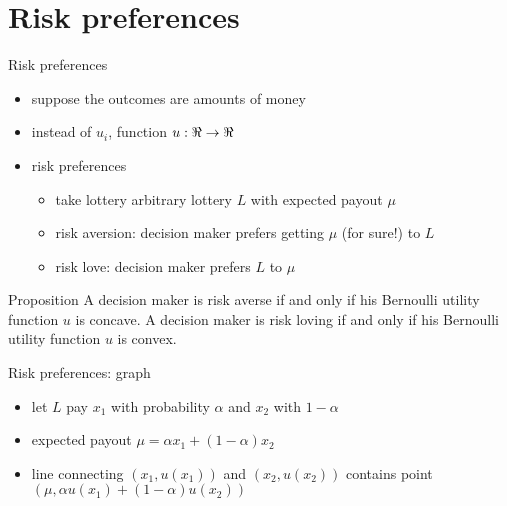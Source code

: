 \documentclass[bigger]{beamer}
\begin{document}
\section{Risk preferences}
\label{sec:org44f3e05}
\begin{frame}[label={sec:org33037f8}]{Risk preferences}
\begin{itemize}
\item suppose the outcomes are amounts of money
\item instead of \(u_i\),  function  \(u:\Re\rightarrow\Re\)
\item risk preferences
\begin{itemize}
\item take lottery arbitrary lottery \(L\) with expected payout \(\mu\)
\item risk aversion: decision maker prefers getting \(\mu\) (for sure!) to \(L\)
\item risk love: decision maker prefers \(L\) to \(\mu\)
\end{itemize}
\end{itemize}

\begin{block}{Proposition}
A decision maker is risk averse if and only if his Bernoulli utility function \(u\) is concave.\linebreak
A decision maker is risk loving if and only if his Bernoulli utility function \(u\) is convex.
\end{block}
\end{frame}

\begin{frame}[label={sec:orga82766d}]{Risk preferences: graph}
\begin{itemize}
\item let \(L\) pay \(x_1\) with probability \(\alpha\) and \(x_2\) with \(1-\alpha\)
\item expected payout \(\mu=\alpha x_1+(1-\alpha)x_2\)
\item line connecting \((x_1,u(x_1))\) and \((x_2,u(x_2))\) contains point \((\mu,\alpha u(x_1)+(1-\alpha)u(x_2))\)
\end{itemize}
\begin{figure}   
\end{figure}
\end{frame}
\end{document}
